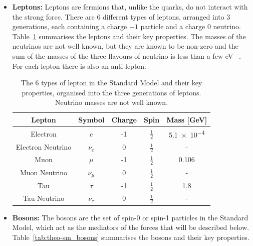 \begin{itemize}[leftmargin=*]
\item\textbf{Leptons:}
  Leptons are fermions that, unlike the quarks, do not interact with the strong force.
  There are 6 different types of leptons,
  arranged into  3 generations, each containing a charge $-1$ particle and a charge 0 neutrino.
  Table~\ref{tab:theo-sm_leptons} summarises the leptons and their key properties.
  The masses of the neutrinos are not well known, but they are known to be non-zero
  and the sum of the masses of the three flavours of neutrino is less than a few eV ~\cite{theo-nu_mass}.
  For each lepton there is also an anti-lepton.
  
  {\renewcommand{\arraystretch}{1.5}
  \begin{table}[!ht]
  \begin{center}
    \begin{tabular}{|c||c|c|c|c|}
      \hline
    Lepton            & Symbol        & Charge  &  Spin           &  Mass [GeV]\\
    \hline
    Electron          &   $e$         &  -1    &  $\frac{1}{2}$   &  \num{5.1e-4}\\
    Electron Neutrino &   $\nu_e$     &  0     &  $\frac{1}{2}$   &  -\\
    \hline                                   
    Muon              &   $\mu$       &  -1    &  $\frac{1}{2}$   &  0.106 \\
    Muon Neutrino     &   $\nu_{\mu}$  &  0     &  $\frac{1}{2}$   &  -\\
    \hline                                      
    Tau               &   $\tau$       &  -1   &  $\frac{1}{2}$   &  1.8\\
    Tau Neutrino      &   $\nu_{\tau}$  &  0    &  $\frac{1}{2}$   &  -\\
    \hline  
  \end{tabular}
    \caption{The 6 types of lepton in the Standard Model and their key properties,
    organised into the three generations of leptons. Neutrino masses are not well known. }
  \label{tab:theo-sm_leptons}
  \end{center}
  \end{table}}
 
\item\textbf{Bosons:}
  The bosons are the set of spin-0 or spin-1 particles in the Standard Model,
  which act as the mediators of the forces that will be described below.
  Table~\ref{tab:theo-sm_bosons} summarises the bosons and their key properties.


\end{itemize}
